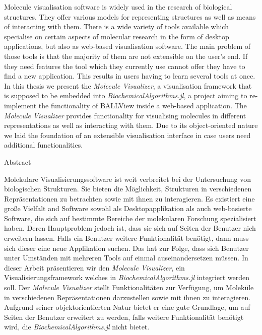 %
\label{sec:abstract}

Molecule visualisation software is widely used in the research of biological structures. They offer various models for representing structures as well as means of interacting with them. There is a wide variety of tools available which specialise on certain aspects of molecular research in the form of desktop applications, but also as web-based visualisation software. The main problem of those tools is that the majority of them are not extensible on the user's end. If they need features the tool which they currently use cannot offer they have to find a new application. This results in users having to learn several tools at once. In this thesis we present the \textit{Molecule Visualizer}, a visualisation framework that is supposed to be embedded into \textit{BiochemicalAlgorithms.jl}, a project aiming to re-implement the functionality of BALLView inside a web-based application. The \textit{Molecule Visualizer} provides functionality for visualising molecules in different representations as well as interacting with them. Due to its object-oriented nature we laid the foundation of an extensible visualisation interface in case users need additional functionalities.

\vspace*{20mm}

{Abstract}
\label{sec:abstract-diff}

Molekulare Visualisierungssoftware ist weit verbreitet bei der Untersuchung von biologischen Strukturen. Sie bieten die Möglichkeit, Strukturen in verschiedenen Repräsentationen zu betrachten sowie mit ihnen zu interagieren. Es existiert eine große Vielfalt and Software sowohl als Desktopapplikation als auch web-basierte Software, die sich auf bestimmte Bereiche der molekularen Forschung spezialisiert haben. Deren Hauptproblem jedoch ist, dass sie sich auf Seiten der Benutzer nich erweitern lassen. Falls ein Benutzer weitere Funktionalität benötigt, dann muss sich dieser eine neue Applikation suchen. Das hat zur Folge, dass sich Benutzer unter Umständen mit mehreren Tools auf einmal auseinandersetzen müssen. In dieser Arbeit präsentieren wir den \textit{Molecule Visualizer}, ein Visualisierungsframework welches in \textit{BiochemicalAlgorithms.jl} integriert werden soll. Der \textit{Molecule Visualizer} stellt Funktionalitäten zur Verfügung, um Moleküle in verschiedenen Repräsentationen darzustellen sowie mit ihnen zu interagieren. Aufgrund seiner objektorientierten Natur bietet er eine gute Grundlage, um auf Seiten der Benutzer erweitert zu werden, falls weitere Funktionalität benötigt wird, die \textit{BiochemicalAlgorithms.jl} nicht bietet.